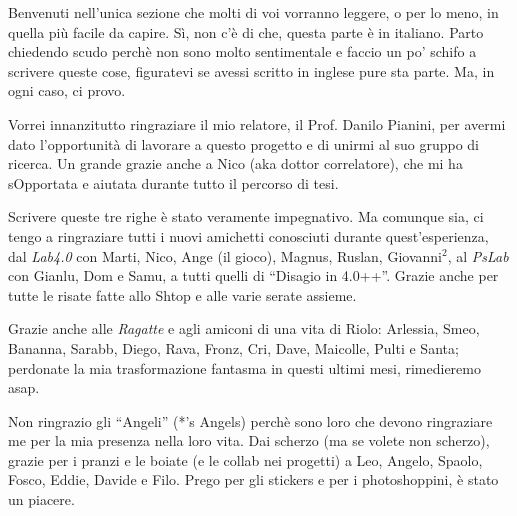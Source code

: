\documentclass[12pt,a4paper,openright,twoside]{book}
\begin{document}
\mainmatter






\backmatter

\nocite{*} %





\begin{acknowledgements} %
    Benvenuti nell'unica sezione che molti di voi vorranno leggere, o per lo meno, in quella più facile da capire.
    Sì, non c'è di che, questa parte è in italiano.
    Parto chiedendo scudo perchè non sono molto sentimentale e faccio un po' schifo a scrivere queste cose, figuratevi
    se avessi scritto in inglese pure sta parte.
    Ma, in ogni caso, ci provo.

    Vorrei innanzitutto ringraziare il mio relatore, il Prof. Danilo Pianini, per avermi dato l'opportunità di lavorare
    a questo progetto e di unirmi al suo gruppo di ricerca.
    Un grande grazie anche a Nico (aka dottor correlatore), che mi ha sOpportata e aiutata durante tutto il percorso di tesi.

    Scrivere queste tre righe è stato veramente impegnativo.
    Ma comunque sia, ci tengo a ringraziare tutti i nuovi amichetti conosciuti durante quest'esperienza, dal \emph{Lab4.0} con
    Marti, Nico, Ange (il gioco), Magnus, Ruslan, Giovanni$^2$, al \emph{PsLab} con Gianlu, Dom e Samu, a tutti quelli
    di ``Disagio in 4.0++''.
    Grazie anche per tutte le risate fatte allo Shtop e alle varie serate assieme.

    Grazie anche alle \emph{Ragatte} e agli amiconi di una vita di Riolo: Arlessia, Smeo, Bananna, Sarabb, Diego, Rava, Fronz,
    Cri, Dave, Maicolle, Pulti e Santa; perdonate la mia trasformazione fantasma in questi ultimi mesi, rimedieremo asap.

    Non ringrazio gli ``Angeli'' (*'s Angels) perchè sono loro che devono ringraziare me per la mia presenza nella loro vita.
    Dai scherzo (ma se volete non scherzo), grazie per i pranzi e le boiate (e le collab nei progetti) a Leo,
    Angelo, Spaolo, Fosco, Eddie, Davide e Filo.
    Prego per gli stickers e per i photoshoppini, è stato un piacere.


\end{acknowledgements}
\end{document}
